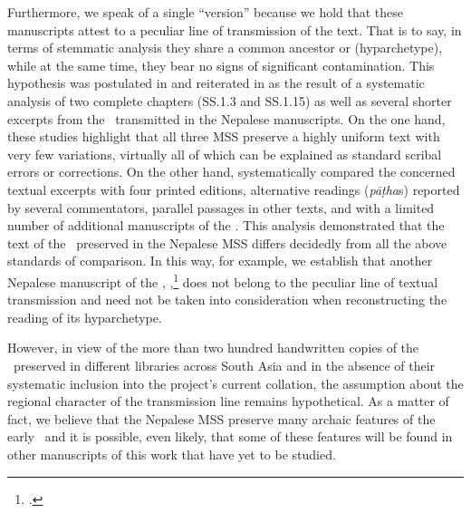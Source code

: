 Furthermore, we speak of a single “version” because we hold that these manuscripts
attest to a peculiar line of transmission of the text.  That is to say, in terms of
stemmatic analysis they share %
a common ancestor or (hyparchetype), while at the same time, they
bear no signs of significant contamination.  This hypothesis was postulated in
\citet{kleb-2010} and reiterated in \citet{kleb-2021a} as the result of a
systematic analysis of two complete chapters (SS.1.3 and SS.1.15) %
as well as several shorter excerpts from the \SS\ transmitted in the Nepalese
manuscripts. On the one hand, these studies highlight that all three MSS preserve
a highly uniform text with very few variations, virtually all of which can be
explained as standard scribal errors or corrections. On the other hand,
\citet{kleb-2010,kleb-2021a} systematically compared %
the concerned textual excerpts with four printed editions, alternative readings
(\emph{pāṭha}s) reported by several commentators, %
parallel passages in other texts, and with a limited number of additional
manuscripts of the \SS. This analysis demonstrated that the text of the \SS\
preserved in the Nepalese MSS differs decidedly from all the above standards of
comparison. In this way, for example, we establish that another Nepalese
manuscript of the \SS, \MS{Kathmandu NAK 1-1146},\footcite{rima-2022} does not
belong to the peculiar line of textual transmission and need not be taken into
consideration when reconstructing the reading of its hyparchetype. 

However, in view of the more than two hundred handwritten copies of the \SS\ preserved
in different libraries across South Asia and in the absence of their systematic
inclusion into the project's current collation, 
the assumption about the regional character of the transmission line remains
hypothetical. As a matter of fact, we believe that the Nepalese MSS
preserve many archaic features of the early \SS\ and it is possible, even likely, that
some of these features will be found in other manuscripts of this work that have
yet to be studied.%

